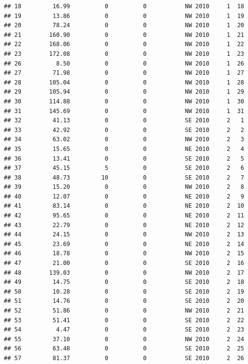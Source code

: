 \documentclass[
]{article}
\begin{document}
\begin{verbatim}
## 18         16.99          0          0           NW 2010     1  18
## 19         13.86          0          0           NW 2010     1  19
## 20         78.24          0          0           NW 2010     1  20
## 21        160.90          0          0           NW 2010     1  21
## 22        168.06          0          0           NW 2010     1  22
## 23        172.08          0          0           NW 2010     1  23
## 26          8.50          0          0           NW 2010     1  26
## 27         71.98          0          0           NW 2010     1  27
## 28        105.04          0          0           NW 2010     1  28
## 29        105.94          0          0           NW 2010     1  29
## 30        114.88          0          0           NW 2010     1  30
## 31        145.69          0          0           NW 2010     1  31
## 32         41.13          0          0           SE 2010     2   1
## 33         42.92          0          0           SE 2010     2   2
## 34         63.02          0          0           NW 2010     2   3
## 35         15.65          0          0           NE 2010     2   4
## 36         13.41          0          0           SE 2010     2   5
## 37         45.15          5          0           SE 2010     2   6
## 38         48.73         10          0           SE 2010     2   7
## 39         15.20          0          0           NW 2010     2   8
## 40         12.07          0          0           NE 2010     2   9
## 41         83.14          0          0           NE 2010     2  10
## 42         95.65          0          0           NE 2010     2  11
## 43         22.79          0          0           NE 2010     2  12
## 44         24.15          0          0           NW 2010     2  13
## 45         23.69          0          0           NE 2010     2  14
## 46         18.78          0          0           NW 2010     2  15
## 47         21.00          0          0           SE 2010     2  16
## 48        139.03          0          0           NW 2010     2  17
## 49         14.75          0          0           SE 2010     2  18
## 50         10.28          0          0           SE 2010     2  19
## 51         14.76          0          0           SE 2010     2  20
## 52         51.86          0          0           NW 2010     2  21
## 53         51.41          0          0           SE 2010     2  22
## 54          4.47          0          0           SE 2010     2  23
## 55         37.10          0          0           NW 2010     2  24
## 56         63.48          0          0           SE 2010     2  25
## 57         81.37          0          0           SE 2010     2  26

\end{verbatim}
\end{document}
